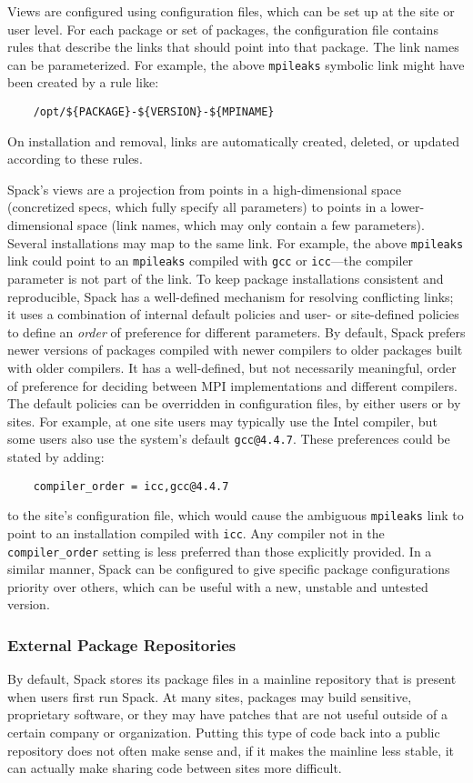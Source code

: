Views are configured using configuration files, which can be set up at the site or
user level.
For each package or set of packages, the configuration file contains rules
that describe the links that should point into that package.
The link names can be parameterized.
For example, the above {\tt mpileaks} symbolic link might have been created by a rule like:
%
\begin{verbatim}
    /opt/${PACKAGE}-${VERSION}-${MPINAME}
\end{verbatim}
%
On installation and removal,
links are automatically created, deleted, or updated according to these rules.

Spack's views are a projection from points in a high-dimensional space
(concretized specs, which fully specify all parameters) to points
in a lower-dimensional space
(link names, which may only contain a few parameters).
Several installations may map to the same link.
For example, the above {\tt mpileaks} link could point to an {\tt mpileaks} compiled with
{\tt gcc} or {\tt icc}---the compiler parameter is not part of the link.
To keep  package installations consistent and reproducible,
Spack has a well-defined mechanism for resolving conflicting links;
it uses a combination of internal default policies and user- or site-defined
policies to define an {\it order} of preference for different parameters.
By default, Spack prefers newer versions of packages compiled with newer compilers
to older packages built with older compilers. It has a well-defined, but not
necessarily meaningful, order of preference for deciding between MPI
implementations and different compilers.
The default policies can be overridden in configuration files, by either users
or by sites. For example, at one site users may typically use the Intel compiler,
but some users also use the system's default {\tt gcc@4.4.7}.
These preferences could be stated by adding:
%
\begin{verbatim}
    compiler_order = icc,gcc@4.4.7
\end{verbatim}
%
to the site's configuration file, which would cause the ambiguous
{\tt mpileaks} link to point to an installation compiled with {\tt icc}.
Any compiler not in the {\tt compiler\_order} setting is less 
preferred than those explicitly provided.
%
In a similar manner, Spack can be configured to give specific package
configurations priority over others, which can be useful with a new, unstable 
and untested version.

\subsubsection{External Package Repositories}
By default, Spack stores its package files in a mainline repository
that is present when users
first run Spack.  At many sites, packages may build sensitive,
proprietary software, or they
may have patches that are not useful outside of a certain company or
organization.  Putting this type of code back into a public repository
does not often make sense and, if it makes the
mainline less stable, it can actually make sharing code between sites more difficult.

